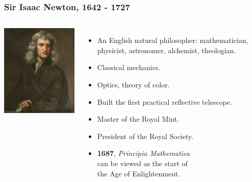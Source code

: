 \documentclass[aspectratio=169,xcolor=pdftex,dvipsnames]{beamer} %
\begin{document}
\begin{frame}
\frametitle{Sir Isaac Newton, 1642 - 1727}

\begin{columns}
      \includegraphics[width=65mm]{newton.jpg}
          
\begin{itemize}
\item
An English natural philosopher: mathematician, physicist, astronomer, alchemist, theologian.
\item
Classical mechanics.
\item
Optics, theory of color.
\item 
Built the first practical reflective telescope.
\item
Master of the Royal Mint.
\item
President of the Royal Society.
\item
\textbf{1687}, \textit{Principia Mathematica}\\
can be viewed as the start of\\ the Age of Enlightenment.
\end{itemize}

\end{columns} 

\end{frame}
\end{document}

